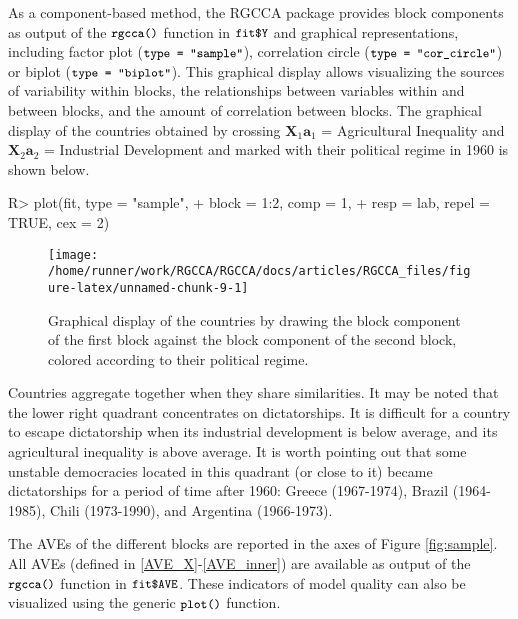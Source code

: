 \documentclass[
]{jss}
\begin{document}
\normalsize

As a component-based method, the RGCCA package provides block components
as output of the \(\small{\texttt{rgcca()}}\) function in
\(\small{\texttt{fit\$Y}}\) and graphical representations, including
factor plot (\(\small{\texttt{type = "sample"}}\)), correlation circle
(\(\small{\texttt{type = "cor\_circle"}}\)) or biplot
(\(\small{\texttt{type = "biplot"}}\)). This graphical display allows
visualizing the sources of variability within blocks, the relationships
between variables within and between blocks, and the amount of
correlation between blocks. The graphical display of the countries
obtained by crossing \(\mathbf X_1 \mathbf a_1\) = Agricultural
Inequality and \(\mathbf X_2 \mathbf a_2\) = Industrial Development and
marked with their political regime in 1960 is shown below.

\footnotesize

\begin{CodeChunk}
\begin{CodeInput}
R> plot(fit, type = "sample",
+      block = 1:2, comp = 1,
+      resp = lab, repel = TRUE, cex = 2)
\end{CodeInput}
\begin{figure}[H]

{\centering \texttt{[image: /home/runner/work/RGCCA/RGCCA/docs/articles/RGCCA\_files/figure-latex/unnamed-chunk-9-1]} 

}

\caption{\label{fig:sample}Graphical display of the countries by drawing the block component of the first block against the block component of the second block, colored according to their political regime.}\label{fig:unnamed-chunk-9}
\end{figure}
\end{CodeChunk}

\normalsize

Countries aggregate together when they share similarities. It may be
noted that the lower right quadrant concentrates on dictatorships. It is
difficult for a country to escape dictatorship when its industrial
development is below average, and its agricultural inequality is above
average. It is worth pointing out that some unstable democracies located
in this quadrant (or close to it) became dictatorships for a period of
time after 1960: Greece (1967-1974), Brazil (1964-1985), Chili
(1973-1990), and Argentina (1966-1973).

The AVEs of the different blocks are reported in the axes of Figure
\ref{fig:sample}. All AVEs (defined in \ref{AVE_X}-\ref{AVE_inner}) are
available as output of the \(\small{\texttt{rgcca()}}\) function in
\(\small{\texttt{fit\$AVE}}\). These indicators of model quality can
also be visualized using the generic \(\small{\texttt{plot()}}\)
function.
\end{document}
